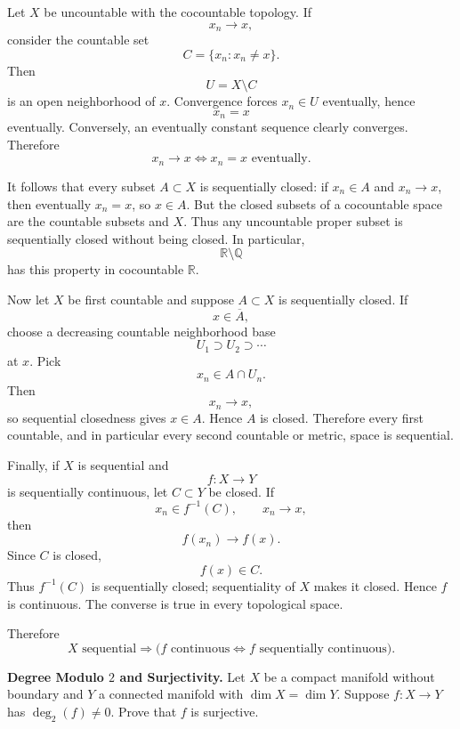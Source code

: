 \begin{solution}
Let \(X\) be uncountable with the cocountable topology. If
\[
x_n\to x,
\]
consider the countable set
\[
C=\{x_n:x_n\neq x\}.
\]
Then
\[
U=X\setminus C
\]
is an open neighborhood of \(x\). Convergence forces \(x_n\in U\) eventually, hence
\[
x_n=x
\]
eventually. Conversely, an eventually constant sequence clearly converges. Therefore
\[
\boxed{x_n\to x\iff x_n=x\text{ eventually}.}
\]

It follows that every subset \(A\subset X\) is sequentially closed: if \(x_n\in A\) and
\(x_n\to x\), then eventually \(x_n=x\), so \(x\in A\). But the closed subsets of a
cocountable space are the countable subsets and \(X\). Thus any uncountable proper subset is
sequentially closed without being closed. In particular,
\[
\mathbb R\setminus\mathbb Q
\]
has this property in cocountable \(\mathbb R\).

Now let \(X\) be first countable and suppose \(A\subset X\) is sequentially closed. If
\[
x\in\overline A,
\]
choose a decreasing countable neighborhood base
\[
U_1\supset U_2\supset\cdots
\]
at \(x\). Pick
\[
x_n\in A\cap U_n.
\]
Then
\[
x_n\to x,
\]
so sequential closedness gives \(x\in A\). Hence \(A\) is closed. Therefore every first
countable, and in particular every second countable or metric, space is sequential.

Finally, if \(X\) is sequential and
\[
f:X\to Y
\]
is sequentially continuous, let \(C\subset Y\) be closed. If
\[
x_n\in f^{-1}(C),
\qquad
x_n\to x,
\]
then
\[
f(x_n)\to f(x).
\]
Since \(C\) is closed,
\[
f(x)\in C.
\]
Thus \(f^{-1}(C)\) is sequentially closed; sequentiality of \(X\) makes it closed. Hence
\(f\) is continuous. The converse is true in every topological space.

Therefore
\[
\boxed{
X\text{ sequential}
\Longrightarrow
\bigl(f\text{ continuous}\iff f\text{ sequentially continuous}\bigr).
}
\]
\end{solution}


\begin{problem}[CP-II-0458]
\label{prob:cp-ii-0458}
\textbf{Degree Modulo \(2\) and Surjectivity.}
Let \(X\) be a compact manifold without boundary and \(Y\) a connected manifold
with \(\dim X=\dim Y\). Suppose \(f:X\to Y\) has \(\deg_2(f)\ne0\).
Prove that \(f\) is surjective.
\end{problem}

